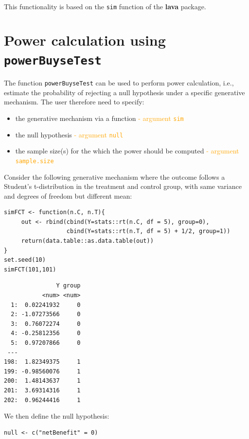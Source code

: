 \documentclass[12pt]{article}
\begin{document}
This functionality is based on the \texttt{sim} function of the \textbf{lava}
package.

\clearpage

\section{Power calculation using \texttt{powerBuyseTest}}
\label{sec:org920e880}

The function \texttt{powerBuyseTest} can be used to perform power
calculation, i.e., estimate the probability of rejecting a null
hypothesis under a specific generative mechanism. The user therefore
need to specify:
\begin{itemize}
\item the generative mechanism via a function \hfill \textcolor{orange}{- argument \texttt{sim}}
\item the null hypothesis \hfill \textcolor{orange}{- argument \texttt{null}}
\item the sample size(s) for the which the power should be computed  \hfill \textcolor{orange}{- argument \texttt{sample.size}}
\end{itemize}

\bigskip

Consider the following generative mechanism where the outcome follows
a Student's t-distribution in the treatment and control group, with same
variance and degrees of freedom but different mean:
\lstset{language=r,label= ,caption= ,captionpos=b,numbers=none}
\begin{lstlisting}
simFCT <- function(n.C, n.T){
     out <- rbind(cbind(Y=stats::rt(n.C, df = 5), group=0),
                  cbind(Y=stats::rt(n.T, df = 5) + 1/2, group=1))
     return(data.table::as.data.table(out))
}
set.seed(10)
simFCT(101,101)
\end{lstlisting}

\begin{verbatim}
               Y group
           <num> <num>
  1:  0.02241932     0
  2: -1.07273566     0
  3:  0.76072274     0
  4: -0.25812356     0
  5:  0.97207866     0
 ---                  
198:  1.82349375     1
199: -0.98560076     1
200:  1.48143637     1
201:  3.69314316     1
202:  0.96244416     1
\end{verbatim}

We then define the null hypothesis:
\lstset{language=r,label= ,caption= ,captionpos=b,numbers=none}
\begin{lstlisting}
null <- c("netBenefit" = 0)
\end{lstlisting}
\end{document}
